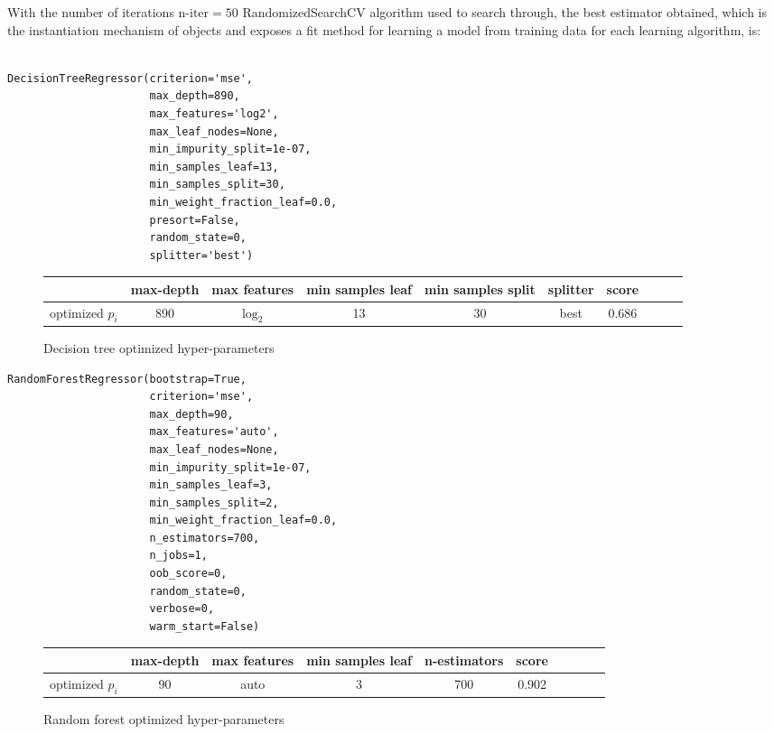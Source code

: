 With the number of iterations $\text{n-iter}=50$ RandomizedSearchCV algorithm used to search through, the best estimator obtained, which is the instantiation
mechanism of objects and exposes a fit method for learning a model from
training data for each learning algorithm, is:   
\begin{tcolorbox}
\begin{verbatim}

DecisionTreeRegressor(criterion='mse', 
                      max_depth=890,       
                      max_features='log2',
                      max_leaf_nodes=None,
                      min_impurity_split=1e-07,
                      min_samples_leaf=13, 
                      min_samples_split=30,
                      min_weight_fraction_leaf=0.0, 
                      presort=False, 
                      random_state=0,
                      splitter='best')
\end{verbatim}
\end{tcolorbox}
\begin{figure}[H]
\centering 
\begin{tabular}{l*{8}{c}r}
\hline
            & max-depth &max features&min samples leaf & min samples split  &splitter& score \\
\hline
optimized $p_i$  & 890 & $\log_2$ & 13 & 30 & best&0.686  \\
\end{tabular}
\caption{Decision tree optimized hyper-parameters }
\end{figure}
\begin{tcolorbox}
\begin{verbatim}
RandomForestRegressor(bootstrap=True,
                      criterion='mse',
                      max_depth=90,
                      max_features='auto',
                      max_leaf_nodes=None,
                      min_impurity_split=1e-07,
                      min_samples_leaf=3,
                      min_samples_split=2,
                      min_weight_fraction_leaf=0.0,
                      n_estimators=700,
                      n_jobs=1, 
                      oob_score=0,
                      random_state=0,
                      verbose=0,
                      warm_start=False)
\end{verbatim}
\end{tcolorbox}
\begin{figure}[H]
\centering 
\begin{tabular}{l*{8}{c}r}
\hline
            & max-depth &max features&min samples leaf &n-estimators & score \\
\hline
optimized $p_i$  & 90 & auto & 3 & 700 & 0.902 \\
\end{tabular}
\caption{Random forest optimized hyper-parameters }
\end{figure}
